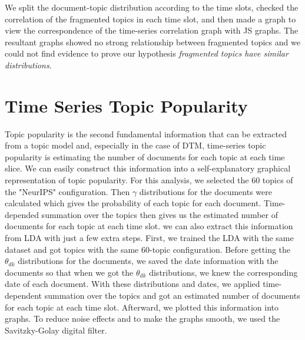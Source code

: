 We split the document-topic distribution according to the time slots, checked the correlation of the fragmented topics in each time slot, and then made a graph to view the correspondence of the time-series correlation graph with JS graphs. The resultant graphs showed no strong relationship between fragmented topics and we could not find evidence to prove our hypothesis \textit{fragmented topics have similar distributions}.

\section{Time Series Topic Popularity}
Topic popularity is the second fundamental information that can be extracted from a topic model and, especially in the case of DTM, time-series topic popularity is estimating the number of documents for each topic at each time slice. We can easily construct this information into a self-explanatory graphical representation of topic popularity. For this analysis, we selected the 60 topics of the "NeurIPS" configuration. Then $\gamma$ distributions for the documents were calculated which gives the probability of each topic for each document. Time-depended summation over the topics then gives us the estimated number of documents for each topic at each time slot. we can also extract this information from LDA with just a few extra steps. First, we trained the LDA with the same dataset and got topics with the same 60-topic configuration. Before getting the $\theta_{dk}$ distributions for the documents, we saved the date information with the documents so that when we got the $\theta_{dk}$ distributions, we knew the corresponding date of each document. With these distributions and dates, we applied time-dependent summation over the topics and got an estimated number of documents for each topic at each time slot. Afterward, we plotted this information into graphs. To reduce noise effects and to make the graphs smooth, we used the Savitzky-Golay digital filter.

